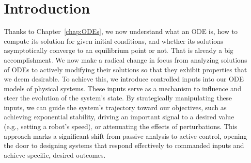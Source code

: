 
\newpage

\begin{center}
\setlength{\fboxrule}{2pt}  %
\end{center}
\vspace*{.2cm}

\section{Introduction}


Thanks to Chapter~\ref{chap:ODEs}, we now understand what an ODE is, how to compute its solution for given initial conditions, and whether its solutions asymptotically converge to an equilibrium point or not. That is already a big accomplishment. We now make a radical change in focus from analyzing solutions of ODEs to actively modifying their solutions so that they exhibit properties that we deem desirable. To achieve this, we introduce controlled inputs into our ODE models of physical systems. These inputs serve as a mechanism to influence and steer the evolution of the system's state. By strategically manipulating these inputs, we can guide the system's trajectory toward our objectives, such as achieving exponential stability, driving an important signal to a desired value (e.g., setting a robot's speed), or attenuating the effects of perturbations. This approach marks a significant shift from passive analysis to active control, opening the door to designing systems that respond effectively to commanded inputs and achieve specific, desired outcomes.

